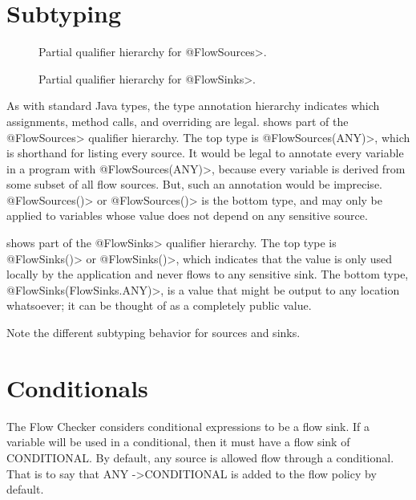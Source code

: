 \section{Subtyping}

\begin{figure}[h]
\caption{Partial qualifier hierarchy for \<@FlowSources>.}
\label{fig:flowsources-hierarchy}
\end{figure}

\begin{figure}[h]
\caption{Partial qualifier hierarchy for \<@FlowSinks>.}
\label{fig:flowsinks-hierarchy}
\end{figure}

As with standard Java types, the type annotation hierarchy indicates which
assignments, method calls, and overriding are legal.  
shows part of the \<@FlowSources>
qualifier hierarchy.  The top type is \<@FlowSources(ANY)>, which is
shorthand for listing every source.  It would be legal to annotate every
variable in a program with \<@FlowSources(ANY)>, because every variable is
derived from some subset of all flow sources.  But, such an annotation
would be imprecise.  \<@FlowSources(\ttcbs)> or \<@FlowSources()> is the
bottom type, and may only
be applied to variables whose value does not depend on any sensitive
source.


 shows part of the \<@FlowSinks>
qualifier hierarchy.  The top type is \<@FlowSinks(\ttcbs)> or
\<@FlowSinks()>, which indicates
that the value is only used locally by the application and never flows to
any sensitive sink.  The bottom type, \<@FlowSinks(FlowSinks.ANY)>, is a
value that might be output to any location whatsoever; it can be thought of
as a completely public value.

Note the different subtyping behavior for sources and sinks.




\section{Conditionals}

The Flow Checker considers conditional expressions to be a flow sink.  If a variable 
will be used in a conditional, then it must have a flow sink of CONDITIONAL.  By default, 
any source is allowed flow through a conditional.  That is to say that 
ANY -\textgreater CONDITIONAL is added to the flow policy by default. 

